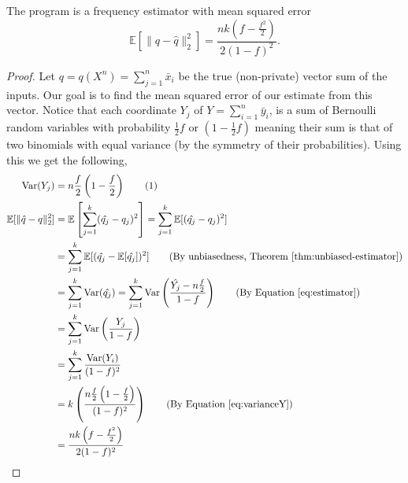\documentclass{article}
\newcommand\numberthis{\addtocounter{equation}{1}\tag{\theequation}}
\begin{document}
\begin{theorem}
	The program  is a frequency estimator with mean squared error
	\begin{equation*}
		\mathbb{E}[\|q-\hat{q}\|_2^2] = \frac{nk\left(f-\frac{f^2}{2}\right)}{2(1-f)^2}.
	\end{equation*}
\end{theorem}
\begin{proof}
    Let $q = q(X^n)=\sum\limits_{j=1}^n \bar{x}_i$ be the true (non-private) vector sum of the inputs. Our goal is to find the mean squared error of our estimate from this vector. Notice that each coordinate $Y_j$ of $Y=\sum_{i=1}^n \bar{y}_i$, is a sum of Bernoulli random variables with probability $\frac{1}{2}f$ or $(1-\frac{1}{2}f)$ meaning their sum is that of two binomials with equal variance (by the symmetry of their probabilities). Using this we get the following,
\begin{align*}
    \text{Var}(Y_j) &= n\frac{f}{2}\left(1-\frac{f}{2}\right) \numberthis \label{eq:varianceY}\\
    \mathbb{E}[\|\hat{q}-q\|_2^2] &= \mathbb{E}\left[\sum\limits_{j=1}^k(\hat{q_j}-q_j)^2\right] = \sum\limits_{j=1}^k\mathbb{E}[(\hat{q_j}-q_j)^2] \\
			&= \sum\limits_{j=1}^k\mathbb{E}[(\hat{q_j}-\mathbb{E}[\hat{q_j}])^2] \tag{By unbiasedness, Theorem~\ref{thm:unbiased-estimator}}\\
			&= \sum\limits_{j=1}^k\text{Var}(\hat{q_j}) = \sum\limits_{j=1}^k\text{Var}\left(\frac{\hat{Y_j}-n\frac{f}{2}}{1-f}\right) \tag{By Equation~\ref{eq:estimator}}\\
			&= \sum\limits_{j=1}^k\text{Var}\left(\frac{Y_j}{1-f}\right) \\
			&= \sum\limits_{j=1}^k\frac{\text{Var}(Y_i)}{(1-f)^2}\\
			&= k\left(\frac{n\frac{f}{2}\left(1-\frac{f}{2}\right)}{(1-f)^2}\right) \tag{By Equation~\ref{eq:varianceY}}\\
			& = \frac{nk\left(f-\frac{f^2}{2}\right)}{2(1-f)^2}
\end{align*}
\end{proof}



\end{document}
